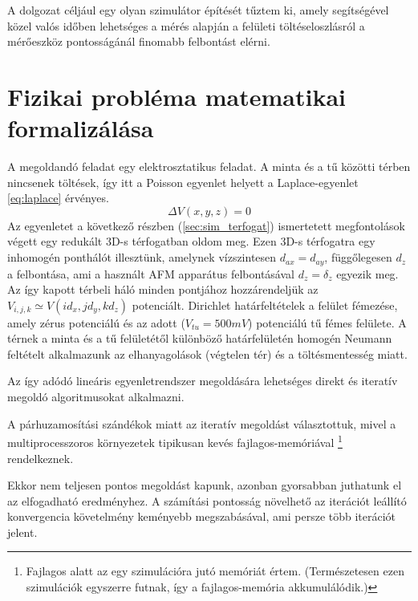 	\noindent
	A dolgozat céljául egy olyan szimulátor építését tűztem ki, amely segítségével közel valós időben 
	lehetséges a mérés alapján a felületi töltéseloszlásról a mérőeszköz pontosságánál finomabb felbontást elérni.
	
	
	
\section{Fizikai probléma matematikai formalizálása}
	
	A megoldandó feladat egy elektrosztatikus feladat.
	A minta és a tű közötti térben nincsenek töltések, így itt a Poisson egyenlet helyett a
	Laplace-egyenlet \ref{eq:laplace} érvényes.
	\begin{equation}\label{eq:laplace}
		\Delta V(x,y,z) = 0 
	\end{equation}
	Az egyenletet a következő részben (\ref{sec:sim_terfogat}) ismertetett  megfontolások végett egy redukált
	3D-s térfogatban oldom meg.
	Ezen 3D-s térfogatra egy inhomogén ponthálót illesztünk, amelynek vízszintesen $d_{ax} = d_{ay}$,
	függőlegesen $d_z$ a felbontása, ami a használt AFM apparátus felbontásával $d_z = \delta_z$ egyezik meg.
	Az így kapott térbeli háló minden pontjához hozzárendeljük az $V_{i,j,k} \simeq V(id_x,jd_y,kd_z)$
	potenciált.
	Dirichlet határfeltételek a felület fémezése, amely zérus potenciálú és az adott ($V_{tu} = 500mV$)
	potenciálú  tű fémes felülete.
	A térnek a minta és a tű felületétől különböző határfelületén homogén Neumann feltételt alkalmazunk
	az elhanyagolások (végtelen tér) és a töltésmentesség miatt.
	
	Az így adódó lineáris egyenletrendszer megoldására lehetséges direkt és iteratív megoldó
	algoritmusokat alkalmazni.
	\begin{changebar}
	A párhuzamosítási szándékok miatt az iteratív megoldást választottuk, mivel a multiprocesszoros
	környezetek tipikusan kevés fajlagos-memóriával
	\footnote{Fajlagos alatt az egy szimulációra jutó
	memóriát értem. (Természetesen ezen szimulációk egyszerre futnak, így a fajlagos-memória
	akkumulálódik.)} rendelkeznek.
	\end{changebar}
	Ekkor nem teljesen pontos megoldást kapunk, azonban gyorsabban juthatunk el az elfogadható eredményhez.
	A számítási pontosság növelhető az iterációt leállító konvergencia követelmény keményebb
	megszabásával, ami persze több iterációt jelent.
	
